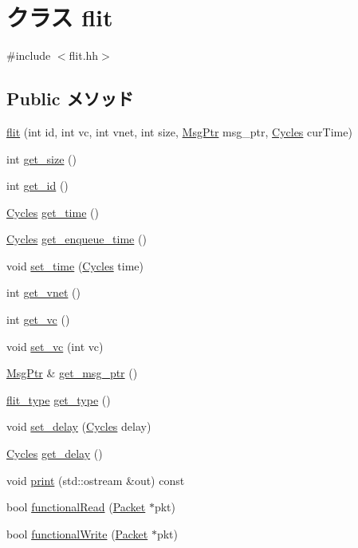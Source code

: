 \hypertarget{classflit}{
\section{クラス flit}
\label{classflit}
}


{\ttfamily \#include $<$flit.hh$>$}\subsection*{Public メソッド}
\begin{DoxyCompactItemize}
\item 
\hyperlink{classflit_a59080d20c32edd5f6ebd4d95281be501}{flit} (int id, int vc, int vnet, int size, \hyperlink{classRefCountingPtr}{MsgPtr} msg\_\-ptr, \hyperlink{classCycles}{Cycles} curTime)
\item 
int \hyperlink{classflit_a885808baa3d930eac7a825f7d49f73d7}{get\_\-size} ()
\item 
int \hyperlink{classflit_a1f0b8f09abd10342468ce33a1da15557}{get\_\-id} ()
\item 
\hyperlink{classCycles}{Cycles} \hyperlink{classflit_a92a32b4bfae6e08f31ab344b857eb8c3}{get\_\-time} ()
\item 
\hyperlink{classCycles}{Cycles} \hyperlink{classflit_a8b7947d2d5ef2f4c39d644d6b8070acb}{get\_\-enqueue\_\-time} ()
\item 
void \hyperlink{classflit_ae1056dab3fa41e4faf25e82848d0a6a5}{set\_\-time} (\hyperlink{classCycles}{Cycles} time)
\item 
int \hyperlink{classflit_af5cc1829c8bdf22f8c0e7225f525c2ba}{get\_\-vnet} ()
\item 
int \hyperlink{classflit_a80b1148ab9b0187938de72d6b03075b1}{get\_\-vc} ()
\item 
void \hyperlink{classflit_a4ce1a22dd3bca1c2111888b02d8f6baa}{set\_\-vc} (int vc)
\item 
\hyperlink{classRefCountingPtr}{MsgPtr} \& \hyperlink{classflit_a7bd37ca8e08e69b8f718e66d1a1e28b1}{get\_\-msg\_\-ptr} ()
\item 
\hyperlink{NetworkHeader_8hh_a2c6c8cfc6307d086e578093535798328}{flit\_\-type} \hyperlink{classflit_aed49ea5767b0f608eccf13129374085a}{get\_\-type} ()
\item 
void \hyperlink{classflit_ab5c471d239a55ffb064ca98eaabcc022}{set\_\-delay} (\hyperlink{classCycles}{Cycles} delay)
\item 
\hyperlink{classCycles}{Cycles} \hyperlink{classflit_a0b5775391c8bacccecf70b147a7dd3e6}{get\_\-delay} ()
\item 
void \hyperlink{classflit_ac55fe386a101fbae38c716067c9966a0}{print} (std::ostream \&out) const 
\item 
bool \hyperlink{classflit_a729f57f557bb42c045c47d9388f1030e}{functionalRead} (\hyperlink{classPacket}{Packet} $\ast$pkt)
\item 
bool \hyperlink{classflit_a14bf46f4c6bb79e5357096af6b9dbffa}{functionalWrite} (\hyperlink{classPacket}{Packet} $\ast$pkt)
\end{DoxyCompactItemize}

